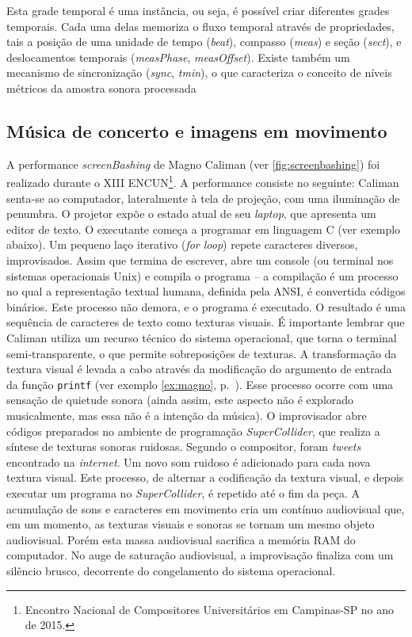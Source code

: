 Esta grade temporal é uma instância, ou seja, é possível criar diferentes grades temporais. Cada uma delas memoriza o fluxo temporal através de propriedades, tais a posição de uma unidade de tempo (\emph{beat}), compasso (\emph{meas}) e seção (\emph{sect}), e deslocamentos temporais (\emph{measPhase}, \emph{measOffset}). Existe também um mecanismo de sincronização (\emph{sync}, \emph{tmin}), o que caracteriza o conceito de níveis métricos da amostra sonora processada

\subsection{Música de concerto e imagens em movimento}\label{sec:concerto}

A performance \emph{screenBashing} de Magno Caliman (ver \autoref{fig:screenbashing}) foi realizado durante o XIII ENCUN\footnote{Encontro Nacional de Compositores Universitários em Campinas-SP no ano de 2015.}. A performance consiste no seguinte: Caliman senta-se ao computador, lateralmente à tela de projeção, com uma iluminação de penumbra. O projetor expõe o estado atual de seu \emph{laptop}, que apresenta um editor de texto. O executante começa a programar em linguagem C (ver exemplo abaixo). Um pequeno laço iterativo (\emph{for loop}) repete caracteres diversos, improvisados. Assim que termina de escrever, abre um console (ou terminal nos sistemas operacionais Unix) e compila o programa -- a compilação é um processo no qual a representação textual humana, definida pela ANSI, é convertida códigos binários. Este processo não demora, e o programa é executado. O resultado é uma sequência de caracteres de texto como texturas visuais. É importante lembrar que Caliman utiliza um recurso técnico do sistema operacional, que torna o terminal semi-transparente, o que permite sobreposições de texturas. A transformação da textura visual é levada a cabo através da modificação do argumento de entrada da função \verb|printf| (ver exemplo \ref{ex:magno}, p.~\pageref{ex:magno}). Esse processo ocorre com uma sensação de quietude sonora (ainda assim, este aspecto não é explorado musicalmente, mas essa não é a intenção da música). O improvisador abre códigos preparados no ambiente de programação  \emph{SuperCollider}, que realiza a síntese de texturas sonoras ruidosas. Segundo o compositor, foram \emph{tweets} encontrado na \emph{internet}. Um novo som ruidoso é adicionado para cada nova textura visual. Este processo, de alternar a codificação da textura visual, e depois executar um programa no \emph{SuperCollider}, é repetido até o fim da peça. A acumulação de sons e caracteres em movimento cria um contínuo audiovisual que, em um momento, as texturas visuais e sonoras se tornam um mesmo objeto audiovisual. Porém esta massa audiovisual sacrifica a memória RAM do computador. No auge de saturação audiovisual, a improvisação finaliza com um silêncio brusco, decorrente do congelamento do sistema operacional.



